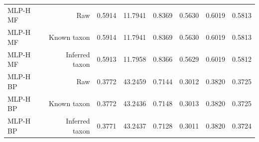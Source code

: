 \begin{longtable}{lrrrrrrr}
MLP-H MF & Raw & 0.5914 & 11.7941 & 0.8369 & 0.5630 & 0.6019 & 0.5813 \\
MLP-H MF & Known taxon & 0.5914 & 11.7941 & 0.8369 & 0.5630 & 0.6019 & 0.5813 \\
MLP-H MF & Inferred taxon & 0.5913 & 11.7958 & 0.8366 & 0.5629 & 0.6019 & 0.5812 \\
MLP-H BP & Raw & 0.3772 & 43.2459 & 0.7144 & 0.3012 & 0.3820 & 0.3725 \\
MLP-H BP & Known taxon & 0.3772 & 43.2436 & 0.7148 & 0.3013 & 0.3820 & 0.3725 \\
MLP-H BP & Inferred taxon & 0.3771 & 43.2437 & 0.7128 & 0.3011 & 0.3820 & 0.3724 \\
\bottomrule
\end{longtable}
\endgroup
